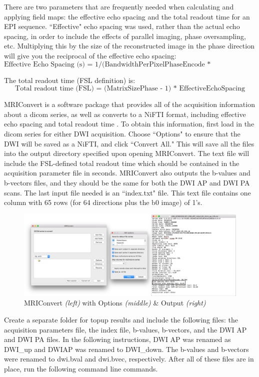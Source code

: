 There are two parameters that are frequently needed when calculating and applying field maps: the effective echo spacing and the total readout time for an EPI sequence. ``Effective" echo spacing was used, rather than the actual echo spacing, in order to include the effects of parallel imaging, phase oversampling, etc. Multiplying this by the size of the reconstructed image in the phase direction will give you the reciprocal of the effective echo spacing:
\[
\text{Effective Echo Spacing (s) = 1/(BandwidthPerPixelPhaseEncode * MatrixSizePhase)}
\]

The total readout time (FSL definition) is:
\[
\text{Total readout time (FSL) = (MatrixSizePhase - 1) * EffectiveEchoSpacing}
\]

MRIConvert is a software package that provides all of the acquisition information about a dicom series, as well as converts to a NiFTI format, including effective echo spacing and total readout time \cite{ref:mriconvert}. To obtain this information, first load in the dicom series for either DWI acquisition. Choose ``Options" to ensure that the DWI will be saved as a NiFTI, and click ``Convert All." This will save all the files into the output directory specified upon opening MRIConvert. The text file will include the FSL-defined total readout time which should be contained in the acquisition parameter file in seconds. MRIConvert also outputs the b-values and b-vectors files, and they should be the same for both the DWI AP and DWI PA scans. The last input file needed is an ``index.txt" file. This text file contains one column with 65 rows (for 64 directions plus the b0 image) of 1's.

\begin{figure}[H]
    \centering
    \includegraphics[width=\textwidth]{Figures/combined}
    \caption{MRIConvert \textit{(left)} with Options \textit{(middle)} \& Output \textit{(right)} }
    \label{fig:mri_convert}
\end{figure}

Create a separate folder for topup results and include the following files: the acquisition parameters file, the index file, b-values, b-vectors, and the DWI AP and DWI PA files. In the following instructions, DWI AP was renamed as DWI\_up and DWIAP was renamed to DWI\_down. The b-values and b-vectors were renamed to dwi.bval and dwi.bvec, respectively. After all of these files are in place, run the following command line commands.

